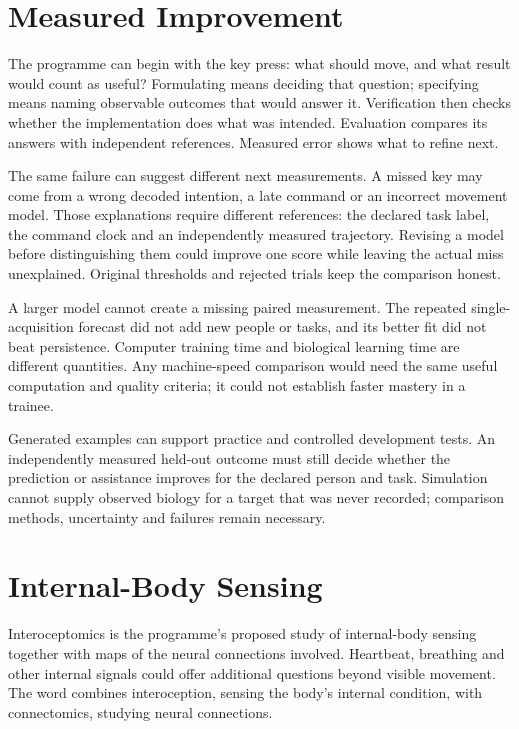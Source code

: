 \section{Measured Improvement}

The programme can begin with the key press: what should move, and what result would count as useful? Formulating means deciding that question; specifying means naming observable outcomes that would answer it. Verification then checks whether the implementation does what was intended. Evaluation compares its answers with independent references. Measured error shows what to refine next.\par

The same failure can suggest different next measurements. A missed key may come from a wrong decoded intention, a late command or an incorrect movement model. Those explanations require different references: the declared task label, the command clock and an independently measured trajectory. Revising a model before distinguishing them could improve one score while leaving the actual miss unexplained. Original thresholds and rejected trials keep the comparison honest.\par

A larger model cannot create a missing paired measurement. The repeated single-acquisition forecast did not add new people or tasks, and its better fit did not beat persistence. Computer training time and biological learning time are different quantities. Any machine-speed comparison would need the same useful computation and quality criteria; it could not establish faster mastery in a trainee.\par

Generated examples can support practice and controlled development tests. An independently measured held-out outcome must still decide whether the prediction or assistance improves for the declared person and task. Simulation cannot supply observed biology for a target that was never recorded; comparison methods, uncertainty and failures remain necessary.\par

\section{Internal-Body Sensing}

Interoceptomics is the programme's proposed study of internal-body sensing together with maps of the neural connections involved. Heartbeat, breathing and other internal signals could offer additional questions beyond visible movement. The word combines interoception, sensing the body's internal condition, with connectomics, studying neural connections.\par

